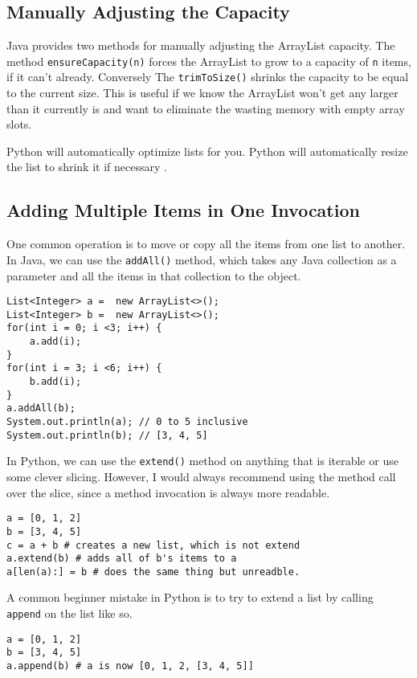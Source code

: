 \subsection{Manually Adjusting the Capacity}

Java provides two methods for manually adjusting the ArrayList capacity.   
The method \texttt{ensureCapacity(n)} forces the ArrayList to grow  to a capacity of \texttt{n} items, if it can't already.
Conversely The \texttt{trimToSize()} shrinks the capacity to be equal to the current size.  This is useful if we know the ArrayList won't get any larger than it currently is and want to eliminate the wasting memory with empty array slots.

Python will automatically optimize lists for you.  Python will automatically resize the list to shrink it if necessary \cite{py-list-source}.


\subsection{Adding Multiple Items in One Invocation}
One common operation is to move or copy all the items from one list to another.
In Java, we can use the \texttt{addAll()} method, which takes any Java collection as a parameter and all the items in that collection to the object.

\begin{verbatim}
List<Integer> a =  new ArrayList<>();
List<Integer> b =  new ArrayList<>();
for(int i = 0; i <3; i++) { 
	a.add(i); 
}
for(int i = 3; i <6; i++) { 
	b.add(i); 
}
a.addAll(b);
System.out.println(a); // 0 to 5 inclusive
System.out.println(b); // [3, 4, 5]
\end{verbatim}

In Python, we can use the \texttt{extend()} method on anything that is iterable or use some clever slicing.  However, I would always recommend using the method call over the slice, since a method invocation is always more readable.


\begin{verbatim}
a = [0, 1, 2]
b = [3, 4, 5]
c = a + b # creates a new list, which is not extend
a.extend(b) # adds all of b's items to a
a[len(a):] = b # does the same thing but unreadble.
\end{verbatim}
A common beginner mistake in Python is to try to extend a list by calling \texttt{append} on the list like so.

\begin{verbatim}
a = [0, 1, 2]
b = [3, 4, 5]
a.append(b) # a is now [0, 1, 2, [3, 4, 5]]
\end{verbatim}



